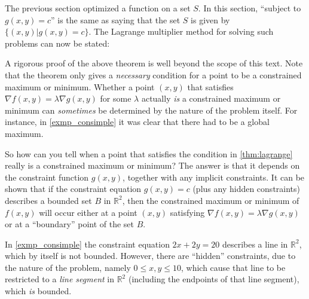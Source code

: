 The previous section optimized a function on a set $S$.  In this section, ``subject to $g(x,y)=c$'' is the same as saying that the set $S$ is given by $\{(x,y)|g(x,y)=c\}$. The Lagrange multiplier method for solving such problems can now be stated:


A rigorous proof of the above theorem is well beyond the scope of this text.
Note that the theorem only gives a \emph{necessary} condition for a point to be a constrained maximum or minimum. Whether a point $(x,y)$ that satisfies $\nabla f(x,y) = \lambda \nabla g(x,y)$ for some $\lambda$ actually \emph{is} a constrained maximum or minimum can \emph{sometimes} be determined by the nature of the problem itself. For instance, in \autoref{exmp_consimple} it was clear that there had to be a global maximum.

So how can you tell when a point that satisfies the condition in \autoref{thm:lagrange} really is a constrained maximum or minimum? The answer is that it depends on the constraint function $g(x,y)$, together with any implicit constraints. It can be shown
that if the constraint equation $g(x,y)=c$ (plus any hidden constraints) describes a bounded set $B$ in $\mathbb{R}^2$, then the constrained maximum or minimum of $f(x,y)$ will occur either at a point $(x,y)$ satisfying $\nabla f(x,y) = \lambda \nabla g(x,y)$ or at a ``boundary'' point of the set $B$.


In \autoref{exmp_consimple} the constraint equation $2x+2y=20$ describes a line in $\mathbb{R}^2$, which by itself is not bounded. However, there are ``hidden'' constraints, due to the nature of the problem, namely $0\le x,y \le 10$, which cause that line to be restricted to a \emph{line segment} in $\mathbb{R}^2$ (including the endpoints of that line segment), which \emph{is} bounded.

